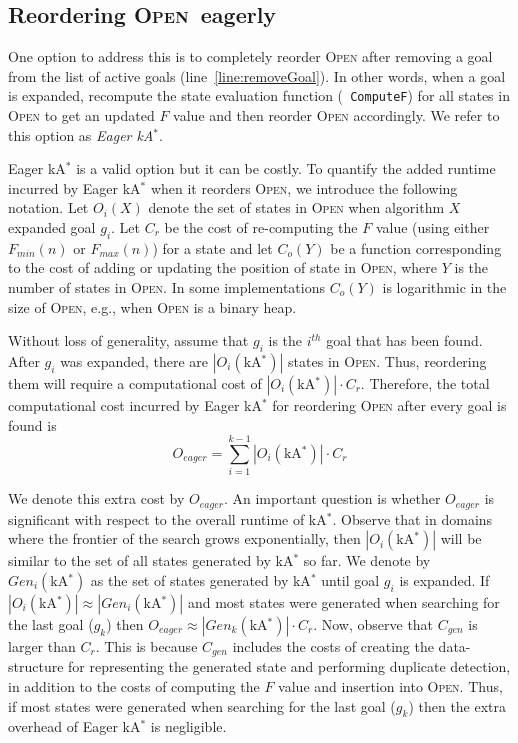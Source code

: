 \documentclass{aicom2e}
\newcommand{\kastar}{kA$^*$}
\newcommand{\minf}{$F_{min}(n)$}
\newcommand{\maxf}{$F_{max}(n)$}
\newcommand{\open}{\textsc{Open}}
\begin{document}
\subsection{Reordering \open\ eagerly}
\label{sec:eager}
One option to address this is to completely reorder \open{} after removing a
goal from the list of active goals (line~\ref{line:removeGoal}). In other
words, when a goal is expanded, recompute the state evaluation function ({\tt
ComputeF}) for all states in \open{} to get an updated $F$ value and then
reorder \open{} accordingly. We refer to this option as {\em Eager \kastar{}}.




Eager \kastar{} is a valid option but it can be costly. To quantify the added runtime
incurred by Eager \kastar{} when it reorders \open{}, we introduce the following notation. 
Let $O_i(X)$ denote the set of states in \open{} when algorithm $X$ expanded goal $g_i$. 
Let $C_r$ be the cost of re-computing the $F$ value (using either \minf{} or \maxf{}) for a state and 
let $C_o(Y)$ be a function corresponding to the cost of 
adding or updating the position of state in \open{}, where $Y$ is the number of states in \open{}. 
In some implementations $C_o(Y)$ is logarithmic in the size of \open{}, e.g., when \open{} is a binary heap. 


Without loss of generality, assume that $g_i$ is the  $i^{th}$ goal that has been found. 
After $g_i$ was expanded, there are $|O_i(\text{\kastar{}})|$ states in \open{}. Thus, reordering them will require a computational cost of $|O_i(\text{\kastar{}})| \cdot C_r$. Therefore, the total computational
cost incurred by Eager \kastar{} for reordering \open{} after every goal is found is 
\begin{equation}
O_{eager}=\sum_{i=1}^{k-1} |O_i(\text{\kastar{}})|\cdot C_r
\label{eq:re-sort-cost}
\end{equation}

We denote this extra cost by $O_{eager}$.
An important question is whether $O_{eager}$ is significant with respect to the overall runtime of \kastar{}. Observe that in domains where the frontier of the search grows exponentially, 
then $|O_i(\text{\kastar{}})|$ will be similar to the set of all states generated by \kastar{} so far. 
We denote by $Gen_i(\text{\kastar{}})$ as the set of states generated by \kastar{} until goal $g_i$ is expanded. 
If $|O_i(\text{\kastar{}})|\approx |Gen_i(\text{\kastar{}})|$ and
 most states were generated when searching for the last goal ($g_k$) 
 then $O_{eager}\approx |Gen_k(\text{\kastar{}})|\cdot C_r$. 
 Now, observe that $C_{gen}$ is larger than $C_r$.
This is because $C_{gen}$ includes the costs of creating the data-structure for representing the generated state and performing duplicate detection,
in addition to the costs of computing the $F$ value and insertion into \open{}.
Thus, if most states were generated when searching for the last goal ($g_k$)
then the extra overhead of Eager \kastar{} is negligible. 
\end{document}
